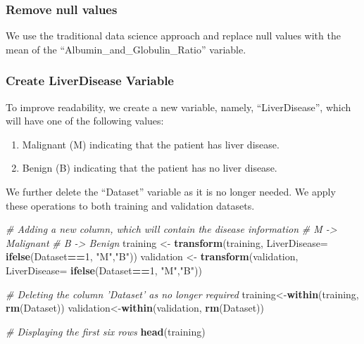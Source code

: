 \documentclass[]{article}
\newenvironment{Shaded}{\begin{snugshade}}{\end{snugshade}}
\newcommand{\CommentTok}[1]{\textcolor[rgb]{0.56,0.35,0.01}{\textit{#1}}}
\newcommand{\DataTypeTok}[1]{\textcolor[rgb]{0.13,0.29,0.53}{#1}}
\newcommand{\DecValTok}[1]{\textcolor[rgb]{0.00,0.00,0.81}{#1}}
\newcommand{\KeywordTok}[1]{\textcolor[rgb]{0.13,0.29,0.53}{\textbf{#1}}}
\newcommand{\NormalTok}[1]{#1}
\newcommand{\OperatorTok}[1]{\textcolor[rgb]{0.81,0.36,0.00}{\textbf{#1}}}
\newcommand{\OtherTok}[1]{\textcolor[rgb]{0.56,0.35,0.01}{#1}}
\newcommand{\StringTok}[1]{\textcolor[rgb]{0.31,0.60,0.02}{#1}}
\begin{document}
\subsubsection{Remove null values}

We use the traditional data science approach and replace null values
with the mean of the ``Albumin\_and\_Globulin\_Ratio'' variable.

\begin{Shaded}
\end{Shaded}

\subsubsection{Create LiverDisease Variable}

To improve readability, we create a new variable, namely,
``LiverDisease'', which will have one of the following values:

\begin{enumerate}
\item Malignant (M) indicating that the patient has liver disease.
\item Benign (B) indicating that the patient has no liver disease.
\end{enumerate}

We further delete the ``Dataset'' variable as it is no longer needed. We
apply these operations to both training and validation datasets.

\begin{Shaded}
\begin{Highlighting}[]
\CommentTok{# Adding a new column, which will contain the disease information}
\CommentTok{# M -> Malignant}
\CommentTok{# B -> Benign}
\NormalTok{training <-}\StringTok{ }\KeywordTok{transform}\NormalTok{(training, }\DataTypeTok{LiverDisease=} \KeywordTok{ifelse}\NormalTok{(Dataset}\OperatorTok{==}\DecValTok{1}\NormalTok{, }\StringTok{"M"}\NormalTok{,}\StringTok{"B"}\NormalTok{))}
\NormalTok{validation <-}\StringTok{ }\KeywordTok{transform}\NormalTok{(validation, }\DataTypeTok{LiverDisease=} \KeywordTok{ifelse}\NormalTok{(Dataset}\OperatorTok{==}\DecValTok{1}\NormalTok{, }\StringTok{"M"}\NormalTok{,}\StringTok{"B"}\NormalTok{))}

\CommentTok{# Deleting the column 'Dataset' as no longer required}
\NormalTok{training<-}\KeywordTok{within}\NormalTok{(training, }\KeywordTok{rm}\NormalTok{(Dataset))}
\NormalTok{validation<-}\KeywordTok{within}\NormalTok{(validation, }\KeywordTok{rm}\NormalTok{(Dataset))}

\CommentTok{# Displaying the first six rows}
\KeywordTok{head}\NormalTok{(training)}
\end{Highlighting}
\end{Shaded}
\end{document}
